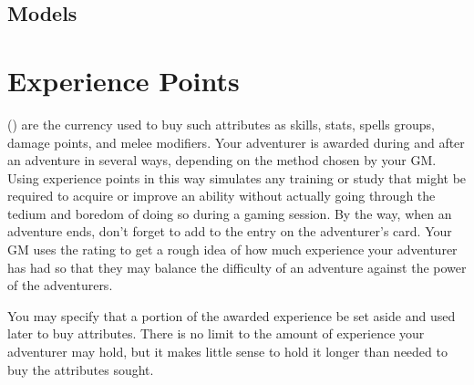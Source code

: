 \begin{multicols*}{2}
\subsection{Models}
\label{create-models}

\pagebreak
\section{Experience Points}
 (\EP) are the currency used to buy such attributes as skills, stats, spells groups, damage points, and melee modifiers. Your adventurer is awarded \EP during and after an adventure in several ways, depending on the method chosen by your GM. Using experience points in this way simulates any training or study that might be required to acquire or improve an ability without actually going through the tedium and boredom of doing so during a gaming session. By the way, when an adventure ends, don't forget to add  to the  entry on the adventurer's card. Your GM uses the rating to get a rough idea of how much experience your adventurer has had so that they may balance the difficulty of an adventure against the power of the adventurers.

You may specify that a portion of the awarded experience be set aside and used later to buy attributes. There is no limit to the amount of experience your adventurer may hold, but it makes little sense to hold it longer than needed to buy the attributes sought.

\end{multicols*}
